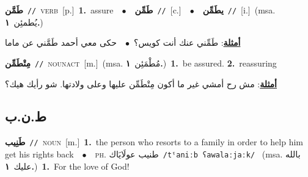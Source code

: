 \documentclass[10pt,a4paper,twoside]{article} %
\begin{document}
\begin{multicols}{2}
{\setlength\topsep{0pt}\textbf{\foreignlanguage{arabic}{طَمَّن}}\ {\color{gray}\texttt{//}\color{black}}\ \textsc{verb}\ [p.]\ \textbf{1.}~assure\ \ $\bullet$\ \ \setlength\topsep{0pt}\textbf{\foreignlanguage{arabic}{طَمِّن}}\ {\color{gray}\texttt{//}\color{black}}\ [c.]\ \ $\bullet$\ \ \setlength\topsep{0pt}\textbf{\foreignlanguage{arabic}{يطَمِّن}}\ {\color{gray}\texttt{//}\color{black}}\ [i.]\ \color{gray}(msa. \foreignlanguage{arabic}{يُطمئِن}~\foreignlanguage{arabic}{\textbf{١.}})\color{black}\  \begin{flushright}\color{gray}\foreignlanguage{arabic}{\textbf{\underline{\foreignlanguage{arabic}{أمثلة}}}: طَمِّني عنك أنت كويس؟\ $\bullet$\ \  حكى معي أحمد طَمَّني عن ماما}\end{flushright}\color{black}} \vspace{2mm}

{\setlength\topsep{0pt}\textbf{\foreignlanguage{arabic}{مِتْطَمِّن}}\ {\color{gray}\texttt{//}\color{black}}\ \textsc{noun\textunderscore act}\ [m.]\ \color{gray}(msa. \foreignlanguage{arabic}{مُطْمَئِن}~\foreignlanguage{arabic}{\textbf{١.}})\color{black}\ \textbf{1.}~be assured.  \textbf{2.}~reassuring\  \begin{flushright}\color{gray}\foreignlanguage{arabic}{\textbf{\underline{\foreignlanguage{arabic}{أمثلة}}}: مش رح أمشي غير ما أكون مِتْطَمِّن عليها وعلى ولادتها. شو رأيك هيك؟}\end{flushright}\color{black}} \vspace{2mm}

\vspace{-3mm}
\subsection*{\color{blue}\foreignlanguage{arabic}{ط.ن.ب}\color{blue}{}} 

{\setlength\topsep{0pt}\textbf{\foreignlanguage{arabic}{طَنِيب}}\ {\color{gray}\texttt{//}\color{black}}\ \textsc{noun}\ [m.]\ \textbf{1.}~the person who resorts to a family in order to help him get his rights back\ \ $\bullet$\ \ \textsc{ph.} \color{gray} \foreignlanguage{arabic}{طنيب عولَايَاك}\color{black}\ {\color{gray}\texttt{/{\sffamily tˤaniːb ʕawalaːjaːk}/}\color{black}}\ \color{gray} (msa. \foreignlanguage{arabic}{بالله عليك}~\foreignlanguage{arabic}{\textbf{١.}})\color{black}\ \textbf{1.}~For the love of God!\ } \vspace{2mm}


\end{multicols}
\end{document}
